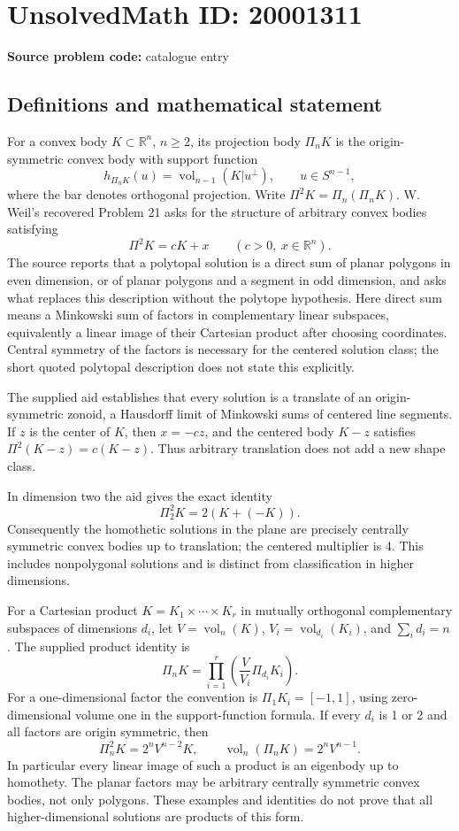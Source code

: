 \documentclass[11pt]{article}
\newcommand{\R}{\mathbb{R}}
\begin{document}
\section*{UnsolvedMath ID: 20001311}
\textbf{Source problem code:} catalogue entry
\subsection{Definitions and mathematical statement}
For a convex body \(K\subset\R^n\), \(n\ge2\), its projection body \(\Pi_nK\) is the origin-symmetric convex body with support function
\[
h_{\Pi_nK}(u)=\operatorname{vol}_{n-1}(K|u^\perp),\qquad u\in S^{n-1},
\]
where the bar denotes orthogonal projection. Write \(\Pi^2K=\Pi_n(\Pi_nK)\). W. Weil's recovered Problem 21 asks for the structure of arbitrary convex bodies satisfying
\[
\Pi^2K=cK+x\qquad(c>0,\ x\in\R^n).
\]
The source reports that a polytopal solution is a direct sum of planar polygons in even dimension, or of planar polygons and a segment in odd dimension, and asks what replaces this description without the polytope hypothesis. Here direct sum means a Minkowski sum of factors in complementary linear subspaces, equivalently a linear image of their Cartesian product after choosing coordinates. Central symmetry of the factors is necessary for the centered solution class; the short quoted polytopal description does not state this explicitly.

The supplied aid establishes that every solution is a translate of an origin-symmetric zonoid, a Hausdorff limit of Minkowski sums of centered line segments. If \(z\) is the center of \(K\), then \(x=-cz\), and the centered body \(K-z\) satisfies \(\Pi^2(K-z)=c(K-z)\). Thus arbitrary translation does not add a new shape class.

In dimension two the aid gives the exact identity
\[
\Pi_2^2K=2(K+(-K)).
\]
Consequently the homothetic solutions in the plane are precisely centrally symmetric convex bodies up to translation; the centered multiplier is 4. This includes nonpolygonal solutions and is distinct from classification in higher dimensions.

For a Cartesian product \(K=K_1\times\cdots\times K_r\) in mutually orthogonal complementary subspaces of dimensions \(d_i\), let \(V=\operatorname{vol}_n(K)\), \(V_i=\operatorname{vol}_{d_i}(K_i)\), and \(\sum_i d_i=n\). The supplied product identity is
\[
\Pi_nK=\prod_{i=1}^r\left(\frac{V}{V_i}\Pi_{d_i}K_i\right).
\]
For a one-dimensional factor the convention is \(\Pi_1K_i=[-1,1]\), using zero-dimensional volume one in the support-function formula. If every \(d_i\) is 1 or 2 and all factors are origin symmetric, then
\[
\Pi_n^2K=2^nV^{n-2}K,\qquad
\operatorname{vol}_n(\Pi_nK)=2^nV^{n-1}.
\]
In particular every linear image of such a product is an eigenbody up to homothety. The planar factors may be arbitrary centrally symmetric convex bodies, not only polygons. These examples and identities do not prove that all higher-dimensional solutions are products of this form.
\end{document}
